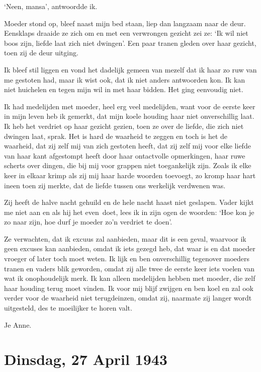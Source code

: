 \documentclass{book}
\begin{document}
`Neen, mansa', antwoordde ik.

Moeder stond op, bleef naast mijn bed staan, liep dan langzaam naar de deur.
Eensklaps draaide ze zich om en met een verwrongen gezicht zei ze: `Ik wil niet
boos zijn, liefde laat zich niet dwingen'. Een paar tranen gleden over haar
gezicht, toen zij de deur uitging.

Ik bleef stil liggen en vond het dadelijk gemeen van mezelf dat ik haar zo ruw
van me gestoten had, maar ik wist ook, dat ik niet anders antwoorden kon. Ik kan
niet huichelen en tegen mijn wil in met haar bidden. Het ging eenvoudig niet.

Ik had medelijden met moeder, heel erg veel medelijden, want voor de eerste keer
in mijn leven heb ik gemerkt, dat mijn koele houding haar niet onverschillig
laat. Ik heb het verdriet op haar gezicht gezien, toen ze over de liefde, die
zich niet dwingen laat, sprak. Het is hard de waarheid te zeggen en toch is het
de waarheid, dat zij zelf mij van zich gestoten heeft, dat zij zelf mij voor
elke liefde van haar kant afgestompt heeft door haar ontactvolle opmerkingen,
haar ruwe scherts over dingen, die bij mij voor grappen niet toegankelijk zijn.
Zoals ik elke keer in elkaar krimp als zij mij haar harde woorden toevoegt, zo
kromp haar hart ineen toen zij merkte, dat de liefde tussen ons werkelijk
verdwenen was.

Zij heeft de halve nacht gehuild en de hele nacht haast niet geslapen.  Vader
kijkt me niet aan en als hij het even~doet, lees ik in zijn ogen de woorden:
`Hoe kon je zo naar zijn, hoe durf je moeder zo'n verdriet te doen'.

Ze verwachten, dat ik excuus zal aanbieden, maar dit is een geval, waarvoor ik
geen excuses kan aanbieden, omdat ik iets gezegd heb, dat waar is en dat moeder
vroeger of later toch moet weten. Ik lijk en ben onverschillig tegenover moeders
tranen en vaders blik geworden, omdat zij alle twee de eerste keer iets voelen
van wat ik onophoudelijk merk.  Ik kan alleen medelijden hebben met moeder, die
zelf haar houding terug moet vinden. Ik voor mij blijf zwijgen en ben koel en
zal ook verder voor de waarheid niet terugdeinzen, omdat zij, naarmate zij
langer wordt uitgesteld, des te moeilijker te horen valt.

Je Anne.

\section*{Dinsdag, 27 April 1943}
\end{document}
